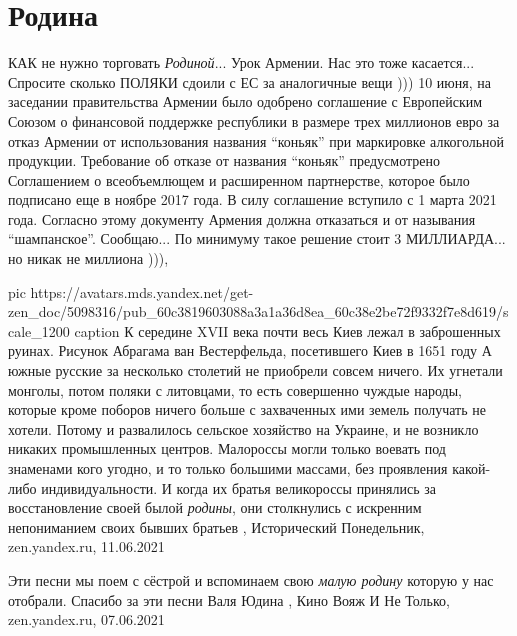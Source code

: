  
 
 
 
 
\chapter{Родина}
\label{sec:slova.rodina}

КАК не нужно торговать \emph{Родиной}...  Урок Армении. Нас это тоже
касается... Спросите сколько ПОЛЯКИ сдоили с ЕС за аналогичные вещи ))) 10
июня, на заседании правительства Армении было одобрено соглашение с Европейским
Союзом о финансовой поддержке республики в размере трех миллионов евро за отказ
Армении от использования названия \enquote{коньяк} при маркировке алкогольной
продукции.  Требование об отказе от названия \enquote{коньяк} предусмотрено Соглашением
о всеобъемлющем и расширенном партнерстве, которое было подписано еще в ноябре
2017 года. В силу соглашение вступило с 1 марта 2021 года.  Согласно этому
документу Армения должна отказаться и от называния \enquote{шампанское}.  Сообщаю... По
минимуму такое решение стоит 3 МИЛЛИАРДА... но никак не миллиона ))),

\ifcmt
	pic https://avatars.mds.yandex.net/get-zen_doc/5098316/pub_60c3819603088a3a1a36d8ea_60c38e2be72f9332f7e8d619/scale_1200
  caption К середине XVII века почти весь Киев лежал в заброшенных руинах. Рисунок Абрагама ван Вестерфельда, посетившего Киев в 1651 году
\fi
А южные русские за несколько столетий не приобрели совсем ничего. Их угнетали
монголы, потом поляки с литовцами, то есть совершенно чуждые народы, которые
кроме поборов ничего больше с захваченных ими земель получать не хотели. Потому
и развалилось сельское хозяйство на Украине, и не возникло никаких промышленных
центров. Малороссы могли только воевать под знаменами кого угодно, и то только
большими массами, без проявления какой-либо индивидуальности. И когда их братья
великороссы принялись за восстановление своей былой \emph{родины}, они столкнулись с
искренним непониманием своих бывших братьев
, 
Исторический Понедельник, zen.yandex.ru, 11.06.2021

Эти песни мы поем с сёстрой и вспоминаем свою \emph{малую родину} которую у нас отобрали. Спасибо за эти песни
Валя Юдина
, 
Кино Вояж И Не Только, zen.yandex.ru, 07.06.2021


